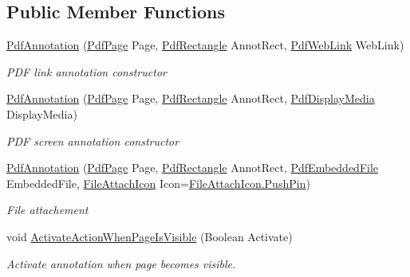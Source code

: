 \subsection*{Public Member Functions}
\begin{DoxyCompactItemize}
\item 
\hyperlink{class_pdf_file_writer_1_1_pdf_annotation_af60ca2d19ada5471d90f8118ebed31b7}{Pdf\+Annotation} (\hyperlink{class_pdf_file_writer_1_1_pdf_page}{Pdf\+Page} Page, \hyperlink{class_pdf_file_writer_1_1_pdf_rectangle}{Pdf\+Rectangle} Annot\+Rect, \hyperlink{class_pdf_file_writer_1_1_pdf_web_link}{Pdf\+Web\+Link} Web\+Link)
\begin{DoxyCompactList}\small\item\em P\+DF link annotation constructor \end{DoxyCompactList}\item 
\hyperlink{class_pdf_file_writer_1_1_pdf_annotation_aa47e27b4fb1365d014e8da61cbd2681b}{Pdf\+Annotation} (\hyperlink{class_pdf_file_writer_1_1_pdf_page}{Pdf\+Page} Page, \hyperlink{class_pdf_file_writer_1_1_pdf_rectangle}{Pdf\+Rectangle} Annot\+Rect, \hyperlink{class_pdf_file_writer_1_1_pdf_display_media}{Pdf\+Display\+Media} Display\+Media)
\begin{DoxyCompactList}\small\item\em P\+DF screen annotation constructor \end{DoxyCompactList}\item 
\hyperlink{class_pdf_file_writer_1_1_pdf_annotation_a6a6e9106be48d991badb846aa26271cd}{Pdf\+Annotation} (\hyperlink{class_pdf_file_writer_1_1_pdf_page}{Pdf\+Page} Page, \hyperlink{class_pdf_file_writer_1_1_pdf_rectangle}{Pdf\+Rectangle} Annot\+Rect, \hyperlink{class_pdf_file_writer_1_1_pdf_embedded_file}{Pdf\+Embedded\+File} Embedded\+File, \hyperlink{namespace_pdf_file_writer_affdf4557b631fa40566a334144b05ae5}{File\+Attach\+Icon} Icon=\hyperlink{namespace_pdf_file_writer_affdf4557b631fa40566a334144b05ae5a9296f4f8bfc9fcfe28e3558866ba6863}{File\+Attach\+Icon.\+Push\+Pin})
\begin{DoxyCompactList}\small\item\em File attachement \end{DoxyCompactList}\item 
void \hyperlink{class_pdf_file_writer_1_1_pdf_annotation_a66252fd77456523940fc56e2c7c735cc}{Activate\+Action\+When\+Page\+Is\+Visible} (Boolean Activate)
\begin{DoxyCompactList}\small\item\em Activate annotation when page becomes visible. \end{DoxyCompactList}\item 

\end{DoxyCompactItemize}
